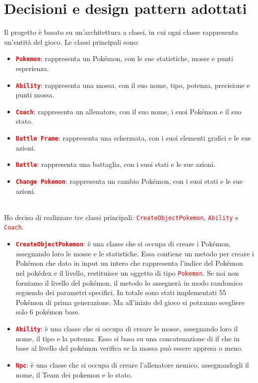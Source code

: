 \documentclass[12pt]{article}
\begin{document}
\newpage
\section{Decisioni e design pattern adottati}
Il progetto è basato su un'architettura a classi, in cui ogni classe rappresenta un'entità del gioco. Le classi principali sono:
\begin{itemize}
    \item \textbf{\texttt{\textcolor{red}{Pokemon}}}: rappresenta un Pokémon, con le sue statistiche, mosse e punti esperienza.
    \item \textbf{\texttt{\textcolor{red}{Ability}}}: rappresenta una mossa, con il suo nome, tipo, potenza, precisione e punti mossa.
    \item \textbf{\texttt{\textcolor{red}{Coach}}}: rappresenta un allenatore, con il suo nome, i suoi Pokémon e il suo stato.
    \item \textbf{\texttt{\textcolor{red}{Battle Frame}}}: rappresenta una schermata, con i suoi elementi grafici e le sue azioni.
    \item \textbf{\texttt{\textcolor{red}{Battle}}}: rappresenta una battaglia, con i suoi stati e le sue azioni.
    \item \textbf{\texttt{\textcolor{red}{Change Pokemon}}}: rappresenta un cambio Pokémon, con i suoi stati e le sue azioni.
\end{itemize}
\par\medskip\noindent \\
Ho deciso di realizzare tre classi principali: \texttt{\textcolor{red}{CreateObjectPokemon}}, \texttt{\textcolor{red}{Ability}} e \texttt{\textcolor{red}{Coach}}.
\begin{itemize}
    \item \textbf{\texttt{\textcolor{red}{CreateObjectPokemon}}}: è una classe che si occupa di creare i Pokémon, assegnando loro le mosse e le statistiche. Essa contiene un metodo per creare i Pokémon che dato in input
          un intero che rappresenta l'indice del Pokémon nel pokédex e il livello, restituisce un oggetto di tipo \texttt{\textcolor{red}{Pokemon}}. Se noi non forniamo il livello del pokémon, il metodo lo assegnerà in modo randomico
          seguendo dei parametri specifici. In totale sono stati implementati 55 Pokémon di prima generazione. Ma all'inizio del gioco si potranno scegliere solo 6 pokémon base.
    \item \textbf{\texttt{\textcolor{red}{Ability}}}: è una classe che si occupa di creare le mosse, assegnando loro il nome, il tipo e la potenza. Esso si basa su una concatenazione di if che in base al livello del pokémon verifica se la mossa può essere appresa o meno.
    \item \textbf{\texttt{\textcolor{red}{Npc}}}: è una classe che si occupa di creare l'allenatore nemico, assegnandogli il nome, il Team dei pokemon e lo stato.
\end{itemize}
\end{document}
